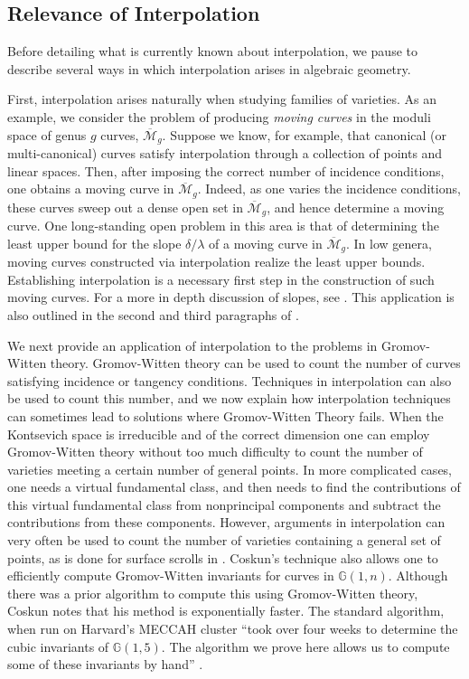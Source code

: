 \documentclass[reqno, 11pt]{amsart}
\theoremstyle{definition}
\theoremstyle{remark}
\numberwithin{equation}{section}
\numberwithin{thm}{section}
\numberwithin{prop}{section}
\numberwithin{lem}{section}
\numberwithin{cor}{section}
\numberwithin{conj}{section}
\numberwithin{defn}{section}
\theoremstyle{plain}
\theoremstyle{definition}
\newcommand\ssec{\subsection}
\newcommand \mg{{\overline{\mathscr M}_g}}
\begin{document}
\ssec{Relevance of Interpolation}

Before detailing what is currently known about interpolation,
we pause to describe several ways in which interpolation
arises in algebraic geometry.

First, interpolation arises naturally when studying families of varieties.  As an example, we consider the problem of producing {\sl moving curves} in the moduli space of genus $g$ curves, 
$\mg$. 
Suppose we know, for example, that canonical (or multi-canonical) curves
satisfy interpolation through a collection of points
and linear spaces. Then, after imposing the correct number of incidence conditions, one obtains a moving curve in $\mg$.
Indeed, as one varies the incidence conditions, these
curves sweep out a dense open set in $\mg$, and hence
determine a moving curve.
One long-standing open problem in this area  is that of determining the least upper bound for
the slope $\delta/\lambda$ of a moving
curve in $\mg$.
In low genera, moving
curves constructed via interpolation realize the least upper bounds. Establishing interpolation is a necessary first step
in the construction of such moving curves. For a more in depth discussion of slopes, see \cite[Section 3.3]{chenFM:effective-divisors-on-moduli-spaces-of-curves-and-abelian-varieties}.
This application is also outlined in the second
and third
paragraphs of \cite{atanasov:interpolation-and-vector-bundles-on-curves}.

We next provide an application of interpolation to the problems in Gromov-Witten theory.
Gromov-Witten theory can be used to count the number of curves satisfying incidence or tangency conditions.
Techniques in interpolation can also be used to count this number,
and we now explain how interpolation techniques can sometimes
lead to solutions where Gromov-Witten Theory fails.
When the Kontsevich space is irreducible and of the correct dimension 
one can employ Gromov-Witten theory without too much
difficulty to count the number of varieties meeting a certain
number of general points. 
In more complicated cases, one needs a virtual fundamental class,
and then needs to find the contributions of this
virtual fundamental class from nonprincipal components
and subtract the contributions from these components.
However, arguments in interpolation can very often be used
to count the number of varieties containing a general set of points,
as is done for surface scrolls in \cite[Results, p.\ 2]{coskun:degenerations-of-surface-scrolls}.
Coskun's technique also allows one to efficiently compute
Gromov-Witten invariants for curves in $\mathbb G(1,n)$.
Although there was a prior algorithm to compute this using
Gromov-Witten theory, Coskun notes that his method
is exponentially faster. The
standard algorithm, when run on Harvard's MECCAH cluster
``took over four weeks to determine the cubic invariants
of $\mathbb G(1,5)$. The algorithm we prove here allows
us to compute some of these invariants by hand'' \cite[p.\ 2]{coskun:degenerations-of-surface-scrolls}.
 
\end{document}
